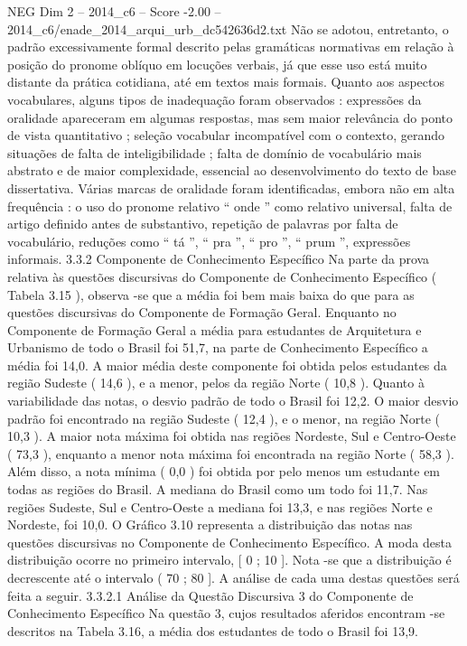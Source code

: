 \begin{textsample}{NEG Dim 2 – 2014\_c6 – Score -2.00 – 2014\_c6/enade\_2014\_arqui\_urb\_dc542636d2.txt}
Não se adotou, entretanto, o padrão excessivamente formal descrito pelas gramáticas normativas em relação à posição do pronome oblíquo em locuções verbais, já que esse uso está muito distante da prática cotidiana, até em textos mais formais.
Quanto aos aspectos vocabulares, alguns tipos de inadequação foram observados : expressões da oralidade apareceram em algumas respostas, mas sem maior relevância do ponto de vista quantitativo ; seleção vocabular incompatível com o contexto, gerando situações de falta de inteligibilidade ; falta de domínio de vocabulário mais abstrato e de maior complexidade, essencial ao desenvolvimento do texto de base dissertativa.
Várias marcas de oralidade foram identificadas, embora não em alta frequência : o uso do pronome relativo “ onde ” como relativo universal, falta de artigo definido antes de substantivo, repetição de palavras por falta de vocabulário, reduções como “ tá ”, “ pra ”, “ pro ”, “ prum ”, expressões informais. 3.3.2 Componente de Conhecimento Específico Na parte da prova relativa às questões discursivas do Componente de Conhecimento Específico ( Tabela 3.15 ), observa -se que a média foi bem mais baixa do que para as questões discursivas do Componente de Formação Geral.
Enquanto no Componente de Formação Geral a média para estudantes de Arquitetura e Urbanismo de todo o Brasil foi 51,7, na parte de Conhecimento Específico a média foi 14,0.
A maior média deste componente foi obtida pelos estudantes da região Sudeste ( 14,6 ), e a menor, pelos da região Norte ( 10,8 ).
Quanto à variabilidade das notas, o desvio padrão de todo o Brasil foi 12,2.
O maior desvio padrão foi encontrado na região Sudeste ( 12,4 ), e o menor, na região Norte ( 10,3 ).
A maior nota máxima foi obtida nas regiões Nordeste, Sul e Centro-Oeste ( 73,3 ), enquanto a menor nota máxima foi encontrada na região Norte ( 58,3 ).
Além disso, a nota mínima ( 0,0 ) foi obtida por pelo menos um estudante em todas as regiões do Brasil.
A mediana do Brasil como um todo foi 11,7.
Nas regiões Sudeste, Sul e Centro-Oeste a mediana foi 13,3, e nas regiões Norte e Nordeste, foi 10,0.
O Gráfico 3.10 representa a distribuição das notas nas questões discursivas no Componente de Conhecimento Específico.
A moda desta distribuição ocorre no primeiro intervalo, [ 0 ; 10 ].
Nota -se que a distribuição é decrescente até o intervalo ( 70 ; 80 ].
A análise de cada uma destas questões será feita a seguir. 3.3.2.1 Análise da Questão Discursiva 3 do Componente de Conhecimento Específico Na questão 3, cujos resultados aferidos encontram -se descritos na Tabela 3.16, a média dos estudantes de todo o Brasil foi 13,9.

\end{textsample}
